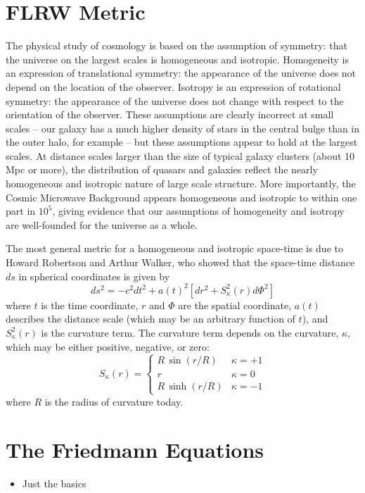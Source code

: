\section{FLRW Metric}
The physical study of cosmology is based on the assumption of symmetry:
that the universe on the largest scales is homogeneous and isotropic.
Homogeneity is an expression of translational symmetry: the appearance of
the universe does not depend on the location of the observer.  Isotropy
is an expression of rotational symmetry: the appearance of the universe
does not change with respect to the orientation of the observer.
These assumptions are clearly incorrect at small scales -- our galaxy
has a much higher density of stars in the central bulge than in the
outer halo, for example -- but these assumptions appear to hold at
the largest scales.  At distance scales larger than the size of
typical galaxy clusters (about 10 Mpc or more), the distribution of
quasars and galaxies reflect the nearly homogeneous and isotropic
nature of large scale structure.  More importantly, the Cosmic Microwave
Background appears homogeneous and isotropic to within one part in
$10^5$, giving evidence that our assumptions of homogeneity and isotropy
are well-founded for the universe as a whole.

The most general metric for a homogeneous and isotropic space-time is due
to Howard Robertson and Arthur Walker, who showed that the space-time
distance $ds$ in spherical coordinates is given by
\begin{equation}
  \label{eq:FLRW_metric}
  ds^2 = -c^2 dt^2 + a(t)^2\left[dr^2 + S_\kappa^2(r)d\Phi^2\right]
\end{equation}
where $t$ is the time coordinate, $r$ and $\Phi$ are the spatial coordinate,
$a(t)$ describes the distance scale (which may be an arbitrary function
of $t$), and $S_\kappa^2(r)$ is the curvature term.  The curvature term
depends on the curvature, $\kappa$, which may be either positive, negative,
or zero:
\begin{equation}
  S_\kappa(r) = \left\{
  \begin{array}{ll}
    R\,\sin(r/R) & \kappa = +1\\
    r & \kappa = 0\\
    R\,\sinh(r/R) & \kappa = -1
  \end{array}
  \right.
\end{equation}
where $R$ is the radius of curvature today.


\section{The Friedmann Equations}
\begin{itemize}
  \item Just the basics
\end{itemize}

